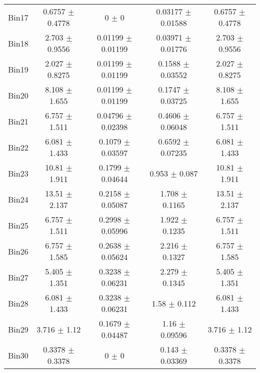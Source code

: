 \begin{tabular}{@{\extracolsep{4pt}}lcccc@{}}
     Bin17 & 0.6757 $\pm$ 0.4778 & 0 $\pm$ 0 & 0.03177 $\pm$ 0.01588 & 0.6757 $\pm$ 0.4778 \\ 
     Bin18 & 2.703 $\pm$ 0.9556 & 0.01199 $\pm$ 0.01199 & 0.03971 $\pm$ 0.01776 & 2.703 $\pm$ 0.9556 \\ 
     Bin19 & 2.027 $\pm$ 0.8275 & 0.01199 $\pm$ 0.01199 & 0.1588 $\pm$ 0.03552 & 2.027 $\pm$ 0.8275 \\ 
     Bin20 & 8.108 $\pm$ 1.655 & 0.01199 $\pm$ 0.01199 & 0.1747 $\pm$ 0.03725 & 8.108 $\pm$ 1.655 \\ 
     Bin21 & 6.757 $\pm$ 1.511 & 0.04796 $\pm$ 0.02398 & 0.4606 $\pm$ 0.06048 & 6.757 $\pm$ 1.511 \\ 
     Bin22 & 6.081 $\pm$ 1.433 & 0.1079 $\pm$ 0.03597 & 0.6592 $\pm$ 0.07235 & 6.081 $\pm$ 1.433 \\ 
     Bin23 & 10.81 $\pm$ 1.911 & 0.1799 $\pm$ 0.04644 & 0.953 $\pm$ 0.087 & 10.81 $\pm$ 1.911 \\ 
     Bin24 & 13.51 $\pm$ 2.137 & 0.2158 $\pm$ 0.05087 & 1.708 $\pm$ 0.1165 & 13.51 $\pm$ 2.137 \\ 
     Bin25 & 6.757 $\pm$ 1.511 & 0.2998 $\pm$ 0.05996 & 1.922 $\pm$ 0.1235 & 6.757 $\pm$ 1.511 \\ 
     Bin26 & 6.757 $\pm$ 1.585 & 0.2638 $\pm$ 0.05624 & 2.216 $\pm$ 0.1327 & 6.757 $\pm$ 1.585 \\ 
     Bin27 & 5.405 $\pm$ 1.351 & 0.3238 $\pm$ 0.06231 & 2.279 $\pm$ 0.1345 & 5.405 $\pm$ 1.351 \\ 
     Bin28 & 6.081 $\pm$ 1.433 & 0.3238 $\pm$ 0.06231 & 1.58 $\pm$ 0.112 & 6.081 $\pm$ 1.433 \\ 
     Bin29 & 3.716 $\pm$ 1.12 & 0.1679 $\pm$ 0.04487 & 1.16 $\pm$ 0.09596 & 3.716 $\pm$ 1.12 \\ 
     Bin30 & 0.3378 $\pm$ 0.3378 & 0 $\pm$ 0 & 0.143 $\pm$ 0.03369 & 0.3378 $\pm$ 0.3378 \\ 
\hline\hline
  \end{tabular}

